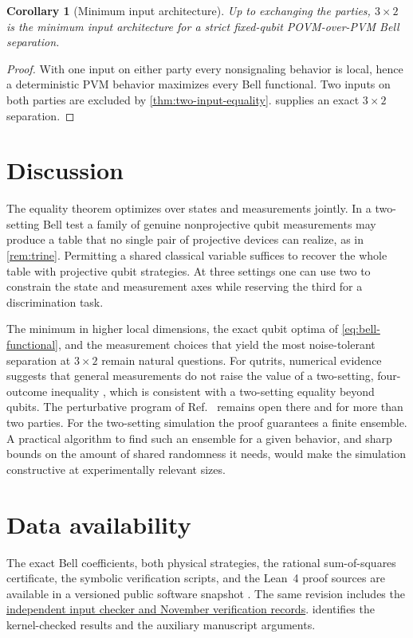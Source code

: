 \documentclass[11pt]{article}
\newtheorem{corollary}[theorem]{Corollary}
\theoremstyle{definition}
\begin{document}
\begin{corollary}[Minimum input architecture]
\label{cor:minimality}
Up to exchanging the parties, \(3\times2\) is the minimum input architecture
for a strict fixed-qubit POVM-over-PVM Bell separation.
\end{corollary}

\begin{proof}
With one input on either party every nonsignaling behavior is local, hence a
deterministic PVM behavior maximizes every Bell functional. Two inputs on both
parties are excluded by \cref{thm:two-input-equality}.
 supplies an exact \(3\times2\) separation.
\end{proof}

\section{Discussion}

The equality theorem optimizes over states and measurements jointly. In a
two-setting Bell test a family of genuine nonprojective qubit measurements
may produce a table that no single pair of projective devices can realize,
as in \cref{rem:trine}. Permitting a shared classical variable suffices to
recover the whole table with projective qubit strategies. At three settings
one can use two to constrain the state and measurement axes while reserving
the third for a discrimination task.

The minimum in higher local dimensions, the exact qubit optima of
\eqref{eq:bell-functional}, and the measurement choices that yield the most
noise-tolerant separation at \(3\times2\) remain natural questions. For
qutrits, numerical evidence suggests that general measurements do not raise
the value of a two-setting, four-outcome inequality \cite{cai2016}, which
is consistent with a two-setting equality beyond qubits. The perturbative
program of Ref.~\cite{cerf2026} remains open there and for more than two
parties. For the
two-setting simulation the proof guarantees a finite ensemble. A practical
algorithm to find such an ensemble for a given behavior, and sharp bounds on
the amount of shared randomness it needs, would make the simulation
constructive at experimentally relevant sizes.

\section*{Data availability}

The exact Bell coefficients, both physical strategies, the rational
sum-of-squares certificate, the symbolic verification scripts, and the
Lean~4 proof sources are available in a versioned public software
snapshot \cite{kriebel2026verification}. The same revision includes the
\href{https://github.com/AlecKriebel/Math/tree/9528ad33e13d4467704426d465795b774bff6495/qubit_povm_pvm_pra_review_20261122}{independent input checker and November verification records}.
 identifies the kernel-checked results and the
auxiliary manuscript arguments.
\end{document}
